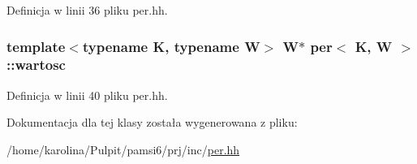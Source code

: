 Definicja w linii 36 pliku per.\-hh.

\hypertarget{classper_a226a74072ab3ff12f6c31e27190762a0}{
\subsubsection[{wartosc}]{\setlength{\rightskip}{0pt plus 5cm}template$<$typename K, typename W$>$ W$\ast$ {\bf per}$<$ K, W $>$\-::wartosc}}\label{classper_a226a74072ab3ff12f6c31e27190762a0}


Definicja w linii 40 pliku per.\-hh.



Dokumentacja dla tej klasy została wygenerowana z pliku\-:\begin{DoxyCompactItemize}
\item 
/home/karolina/\-Pulpit/pamsi6/prj/inc/\hyperlink{per_8hh}{per.\-hh}\end{DoxyCompactItemize}
